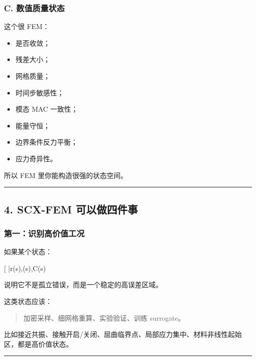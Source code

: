 \documentclass[
  12pt,
]{ctexart}
\providecommand{\tightlist}{%
  \setlength{\itemsep}{0pt}\setlength{\parskip}{0pt}}
\begin{document}
\subsubsection{C.
数值质量状态}\label{c.-ux6570ux503cux8d28ux91cfux72b6ux6001}

这个很 FEM：

\begin{itemize}
\tightlist
\item
  是否收敛；
\item
  残差大小；
\item
  网格质量；
\item
  时间步敏感性；
\item
  模态 MAC 一致性；
\item
  能量守恒；
\item
  边界条件反力平衡；
\item
  应力奇异性。
\end{itemize}

所以 FEM 里你能构造很强的状态空间。

\begin{center}\rule{0.5\linewidth}{0.5pt}\end{center}

\subsection{4. SCX-FEM
可以做四件事}\label{scx-fem-ux53efux4ee5ux505aux56dbux4ef6ux4e8b}

\subsubsection{第一：识别高价值工况}\label{ux7b2cux4e00ux8bc6ux522bux9ad8ux4ef7ux503cux5de5ux51b5}

如果某个状态：

{[} \bar r(s)\uparrow,\quad \rho(s)\uparrow,\quad C(s)\uparrow{]}

说明它不是孤立错误，而是一个稳定的高误差区域。

这类状态应该：

\begin{quote}
加密采样、细网格重算、实验验证、训练 surrogate。
\end{quote}

比如接近共振、接触开启/关闭、屈曲临界点、局部应力集中、材料非线性起始区，都是高价值状态。

\begin{center}\rule{0.5\linewidth}{0.5pt}\end{center}
\end{document}
